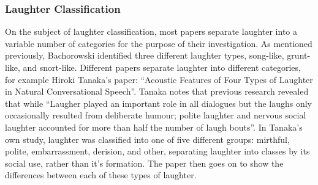 \documentclass[a4paper,11pt,notitlepage]{article}
\begin{document}
\newpage

\subsubsection{Laughter Classification}
On the subject of laughter classification, most papers separate laughter into a variable number of categories for the purpose of their investigation. As mentioned previously, Bachorowski identified three different laughter types, song-like, grunt-like, and snort-like. Different papers separate laughter into different categories, for example Hiroki Tanaka's paper: ``Acoustic Features of Four Types of Laughter in Natural Conversational Speech''.\cite{tanaka2011acoustic} Tanaka notes that previous research revealed that while ``Laugher played an important role in all dialogues but the laughs only occasionally resulted from deliberate humour; polite laughter and nervous social laughter accounted for more than half the number of laugh bouts''\cite{campbell2007changes}. In Tanaka's own study, laughter was classified into one of five different groups: mirthful, polite, embarrassment, derision, and other, separating laughter into classes by its social use, rather than it's formation. The paper then goes on to show the differences between each of these types of laughter.\\
\\
\end{document}
